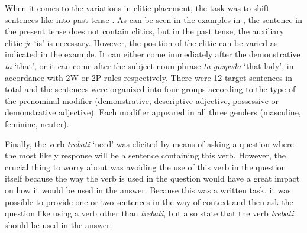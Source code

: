 \documentclass[output=paper,modfonts,newtxmath,hidelinks,]{langscibook}
\begin{document}
\z

\noindent When it comes to the variations in clitic placement, the task was to shift sentences like  into past tense . As can be seen in the examples in , the sentence in the present tense does not contain clitics, but in the past tense, the auxiliary clitic \textit{je} `is' is necessary. However, the position of the clitic can be varied as indicated in the example. It can either come immediately after the demonstrative \textit{ta} `that’, or it can come after the subject noun phrase \textit{ta gospođa} `that lady', in accordance with 2W or 2P rules respectively. There were 12 target sentences in total and the sentences were organized into four groups according to the type of the prenominal modifier (demonstrative, descriptive adjective, possessive or demonstrative adjective). Each modifier appeared in all three genders (masculine, feminine, neuter).

\ea \label{7:ex6}
	\z
\z

\noindent Finally, the verb \textit{trebati} `need' was elicited by means of asking a question where the most likely response will be a sentence containing this verb. However, the crucial thing to worry about was avoiding the use of this verb in the question itself because the way the verb is used in the question would have a great impact on how it would be used in the answer. Because this was a written task, it was possible to provide one or two sentences in the way of context and then ask the question like  using a verb other than \textit{trebati}, but also state that the verb \textit{trebati} should be used in the answer. 
\end{document}
